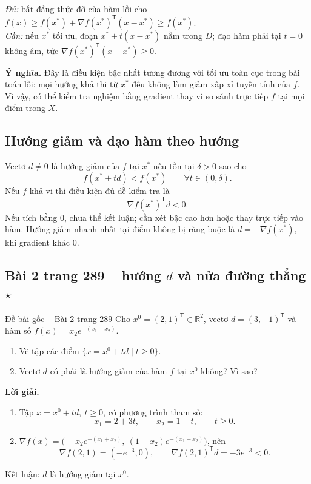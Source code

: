 \documentclass[11pt,a4paper]{article}
\newcommand{\R}{\mathbb{R}}
\newcommand{\grad}{\nabla}
\newcommand{\T}{^{\mathsf T}}
\begin{document}
\textit{Đủ:} bất đẳng thức đỡ của hàm lồi cho \(f(x)\ge f(x^\ast)+\grad f(x^\ast)\T(x-x^\ast)\ge f(x^\ast)\).\\
\textit{Cần:} nếu \(x^\ast\) tối ưu, đoạn \(x^\ast+t(x-x^\ast)\) nằm trong \(D\); đạo hàm phải tại \(t=0\) không âm, tức \(\grad f(x^\ast)\T(x-x^\ast)\ge0\).

\textbf{Ý nghĩa.} Đây là điều kiện bậc nhất tương đương với tối ưu toàn cục trong bài toán lồi: mọi hướng khả thi từ \(x^\ast\) đều không làm giảm xấp xỉ tuyến tính của \(f\). Vì vậy, có thể kiểm tra nghiệm bằng gradient thay vì so sánh trực tiếp \(f\) tại mọi điểm trong \(X\).

\subsection{Hướng giảm và đạo hàm theo hướng}
Vectơ \(d\ne0\) là hướng giảm của \(f\) tại \(x^\ast\) nếu tồn tại \(\delta>0\) sao cho
\[
f(x^\ast+td)<f(x^\ast)\qquad\forall t\in(0,\delta).
\]
Nếu \(f\) khả vi thì điều kiện đủ dễ kiểm tra là
\[
\grad f(x^\ast)\T d<0.
\]
Nếu tích bằng \(0\), chưa thể kết luận; cần xét bậc cao hơn hoặc thay trực tiếp vào hàm. Hướng giảm nhanh nhất tại điểm không bị ràng buộc là \(d=-\grad f(x^\ast)\), khi gradient khác \(0\).

\clearpage
\subsection{Bài 2 trang 289 -- hướng \(d\) và nửa đường thẳng \(\star\)}
\begin{questionbox}{Đề bài gốc -- Bài 2 trang 289}
Cho \(x^0=(2,1)\T\in\R^2\), vectơ \(d=(3,-1)\T\) và hàm số \(f(x)=x_2e^{-(x_1+x_2)}\).
\begin{enumerate}[label=\roman*),nosep,leftmargin=*]
\item Vẽ tập các điểm \(\{x=x^0+td\mid t\ge0\}\).
\item Vectơ \(d\) có phải là hướng giảm của hàm \(f\) tại \(x^0\) không? Vì sao?
\end{enumerate}
\end{questionbox}
\textbf{Lời giải.}
\begin{enumerate}[label=\roman*),nosep,leftmargin=*]
\item Tập \(x=x^0+td,\ t\ge0\), có phương trình tham số:
\[
x_1=2+3t,\qquad x_2=1-t,\qquad t\ge0.
\]
\item \(\grad f(x)=\big(-x_2e^{-(x_1+x_2)},\ (1-x_2)e^{-(x_1+x_2)}\big)\), nên
\[
\grad f(2,1)=(-e^{-3},0),\qquad \grad f(2,1)\T d=-3e^{-3}<0.
\]
\end{enumerate}
Kết luận: \(d\) là hướng giảm tại \(x^0\).
\end{document}
